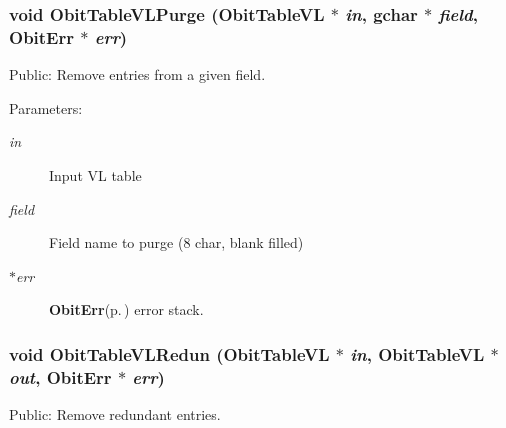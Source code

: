 \subsubsection{\setlength{\rightskip}{0pt plus 5cm}void Obit\-Table\-VLPurge ({\bf Obit\-Table\-VL} $\ast$ {\em in}, gchar $\ast$ {\em field}, {\bf Obit\-Err} $\ast$ {\em err})}\label{ObitTableVLUtil_8c_a14}


Public: Remove entries from a given field. 

\begin{Desc}
\item[Parameters:]
\begin{description}
\item[{\em in}]Input VL table \item[{\em field}]Field name to purge (8 char, blank filled) \item[{\em $\ast$err}]{\bf Obit\-Err}{\rm (p.\,\pageref{structObitErr})} error stack. \end{description}
\end{Desc}
\subsubsection{\setlength{\rightskip}{0pt plus 5cm}void Obit\-Table\-VLRedun ({\bf Obit\-Table\-VL} $\ast$ {\em in}, {\bf Obit\-Table\-VL} $\ast$ {\em out}, {\bf Obit\-Err} $\ast$ {\em err})}\label{ObitTableVLUtil_8c_a15}


Public: Remove redundant entries. 

